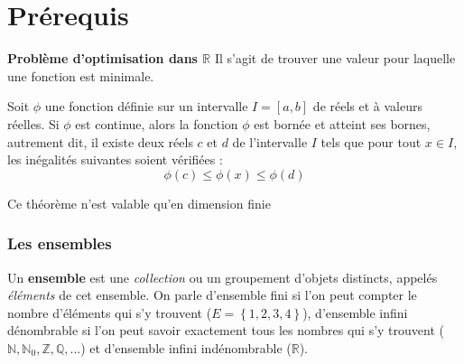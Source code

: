 \part{Prérequis}

\textbf{Problème d'optimisation dans $\mathbb{R}$} Il s'agit de trouver une valeur pour laquelle une fonction  est minimale.

\begin{figure}[H]
    \centering
\end{figure}

\begin{theo} \label{theo:valextr}
    Soit $\phi$ une fonction définie sur un intervalle $I = \left[ a,b \right]$ de réels et à valeurs réelles. Si $\phi$ est continue, alors la fonction $\phi$ est bornée et atteint ses bornes, autrement dit, il existe deux réels $c$ et $d$ de l'intervalle $I$ tels que pour tout $x \in I$, les inégalités suivantes soient vérifiées : \[\phi(c) \leq \phi(x) \leq \phi(d)\]
\end{theo}

\begin{remark}
    Ce théorème n'est valable qu'en dimension finie
\end{remark}

\section{Les ensembles}

\begin{definition}
    Un \textbf{ensemble} est une \textit{collection} ou un groupement d'objets distincts, appelés \textit{éléments} de cet ensemble. On parle d'ensemble fini si l'on peut compter le nombre d'éléments qui s'y trouvent ($E = \left\{ 1,2,3,4 \right\}$), d'ensemble infini dénombrable si l'on peut savoir exactement tous les nombres qui s'y trouvent ($\mathbb{N},\mathbb{N}_0,\mathbb{Z},\mathbb{Q},...$) et d'ensemble infini indénombrable ($\mathbb{R}$).
\end{definition}

